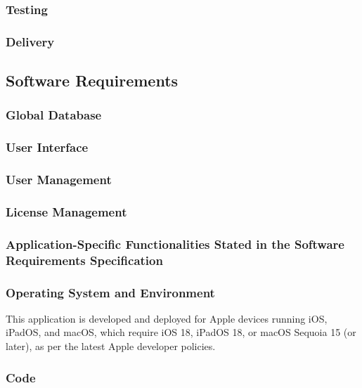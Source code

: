 \documentclass[11pt]{article}
\begin{document}
\subsubsection{Testing}

\subsubsection{Delivery}

\subsection{Software Requirements}

\subsubsection{Global Database}

\subsubsection{User Interface}

\subsubsection{User Management}

\subsubsection{License Management}

\subsubsection{Application-Specific Functionalities Stated in the Software Requirements
Specification}

\subsubsection{Operating System and Environment}

This application is developed and deployed for Apple devices running iOS, iPadOS, and macOS, which require iOS 18, iPadOS 18, or macOS Sequoia 15 (or later), as per the latest Apple developer policies.


\subsubsection{Code}
\end{document}
